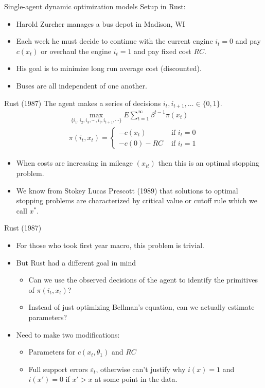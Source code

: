 \documentclass[xcolor=pdftex,dvipsnames,table,mathserif,aspectratio=169]{beamer}
\begin{document}
\begin{frame}{Single-agent dynamic optimization models}
Setup in Rust:
\begin{itemize}
\item Harold Zurcher manages a bus depot in Madison, WI
\item Each week he must decide to continue with the current engine $i_t=0$ and pay $c(x_{t})$ or overhaul the engine $i_t=1$ and pay fixed cost $RC$.
\item His goal is to minimize \alert{long run average cost} (discounted).
\item Buses are all  \alert{independent} of one another.
\end{itemize}
\end{frame}




\begin{frame}{Rust (1987)}
The agent makes a series of decisions $i_t,i_{t+1},\ldots \in \{0,1\}$.
\begin{eqnarray*}
\max_{\{i_1, i_2, i_3, \cdots, i_t, i_{t+1}, \cdots \}} E \sum^{\infty}_{t=1} \beta^{t-1} \pi (x_t)\\
\pi \left(i_{t},x_{t} \right)=
		\begin{cases}
		-c\left(x_{t} \right)  & \mbox{ if }i_{t}=0\\		
		 -c\left(0\right) -RC& \mbox{ if }i_{t}=1
		\end{cases}
\end{eqnarray*}
\begin{itemize}
\item When costs are increasing in mileage $(x_{it})$ then this is an \alert{optimal stopping problem}.
\item We know from Stokey Lucas Prescott (1989) that solutions to optimal stopping problems are characterized by \alert{critical value} or \alert{cutoff rule} which we call $x^*$.
\end{itemize}
\end{frame}

\begin{frame}{Rust (1987)}
\begin{itemize}
\item For those who took first year macro, this problem is trivial. 
\item But Rust had a different goal in mind
\begin{itemize}
\item Can we use the observed decisions of the agent to identify the primitives of $\pi(i_t,x_t)$?
\item Instead of just optimizing Bellman's equation, can we actually \alert{estimate parameters}?
\end{itemize}
\item Need to make two modifications: 
\begin{itemize}
\item Parameters for $c(x_t,\theta_1)$ and $RC$
\item Full support errors $\varepsilon_{t}$, otherwise can't justify why $i(x)=1$ and $i(x')=0$ if $x'>x$ at some point in the data.
\end{itemize}
\end{itemize}
\end{frame}
\end{document}
